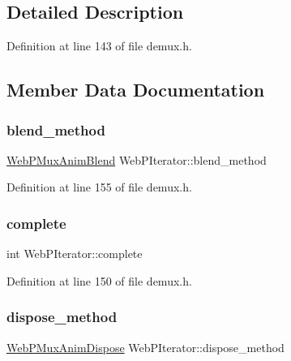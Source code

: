 \subsection{Detailed Description}


Definition at line 143 of file demux.\+h.



\subsection{Member Data Documentation}
\mbox{\label{struct_web_p_iterator_af20f667aab5d6bd7167d813282bee213}} 
\subsubsection{\texorpdfstring{blend\_method}{blend\_method}}
{\footnotesize\ttfamily \mbox{\hyperlink{mux__types_8h_aa954e5371fe03449cc23ae851b689456}{Web\+P\+Mux\+Anim\+Blend}} Web\+P\+Iterator\+::blend\+\_\+method}



Definition at line 155 of file demux.\+h.

\mbox{\label{struct_web_p_iterator_a62cf0395666877963857853e64a775fe}} 
\subsubsection{\texorpdfstring{complete}{complete}}
{\footnotesize\ttfamily int Web\+P\+Iterator\+::complete}



Definition at line 150 of file demux.\+h.

\mbox{\label{struct_web_p_iterator_a14ab4460c7f6af2f92251f12acc7e9ce}} 
\subsubsection{\texorpdfstring{dispose\_method}{dispose\_method}}
{\footnotesize\ttfamily \mbox{\hyperlink{mux__types_8h_a8ff0ce53be803f477f12121687fd517f}{Web\+P\+Mux\+Anim\+Dispose}} Web\+P\+Iterator\+::dispose\+\_\+method}



